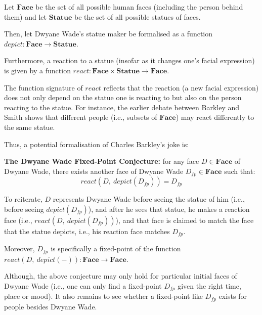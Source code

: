 Let $\textbf{Face}$ be the set of all possible human faces (including the person behind them) and let $\textbf{Statue}$ be the set of all possible statues of faces.

Then, let Dwyane Wade's statue maker be formalised as a function $depict: \textbf{Face} \rightarrow \textbf{Statue}$.

Furthermore, a reaction to a statue (insofar as it changes one's facial expression) is given by a function $react: \textbf{Face} \times \textbf{Statue} \rightarrow \textbf{Face}$.

The function signature of $react$ reflects that the reaction (a new facial expression) does not only depend on the statue one is reacting to but also on the person reacting to the statue. For instance, the earlier debate between Barkley and Smith shows that different people (i.e., subsets of $ \textbf{Face}$) may react differently to the same statue.

Thus, a potential formalisation of Charles Barkley's joke is:

\textbf{The Dwyane Wade Fixed-Point Conjecture:} for any face $D \in \textbf{Face}$ of Dwyane Wade, there exists another face of Dwyane Wade $D_{fp} \in \textbf{Face}$ such that:
\begin{equation*}
    react(D,\ depict(D_{fp})) = D_{fp}
\end{equation*}

To reiterate, $D$ represents Dwyane Wade before seeing the statue of him (i.e., before seeing $depict(D_{fp})$), and after he sees that statue, he makes a reaction face (i.e., $react(D,\ depict(D_{fp}))$), and that face is claimed to match the face that the statue depicts, i.e., his reaction face matches $D_{fp}$.

Moreover, $D_{fp}$ is specifically a fixed-point of the function $react(D,\ depict(-)): \textbf{Face} \rightarrow \textbf{Face}$.

Although, the above conjecture may only hold for particular initial faces of Dwyane Wade (i.e., one can only find a fixed-point $D_{fp}$ given the right time, place or mood). It also remains to see whether a fixed-point like $D_{fp}$ exists for people besides Dwyane Wade.